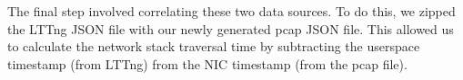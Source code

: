 The final step involved correlating these two data sources. To do this, we zipped the LTTng JSON file with our newly generated pcap JSON file. This allowed us to calculate the network stack traversal time by subtracting the userspace timestamp (from LTTng) from the NIC timestamp (from the pcap file).

